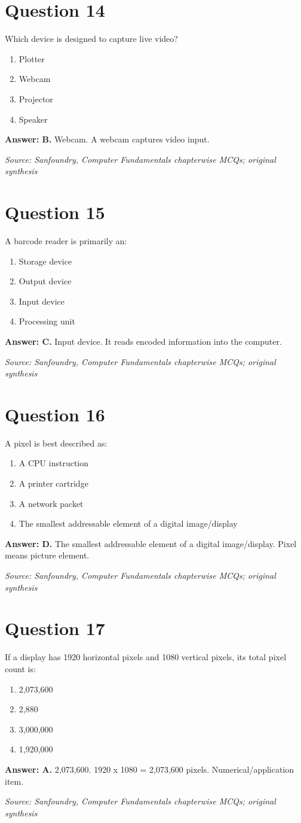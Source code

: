 \documentclass[11pt,a4paper]{book}
\newcommand{\source}[1]{\par\smallskip\textit{Source: #1}}
\newcommand{\answer}[2]{\par\textbf{Answer: #1.} #2}
\begin{document}
\section*{Question 14}
Which device is designed to capture live video?
\begin{enumerate}[label=\Alph*.]
\item Plotter
\item Webcam
\item Projector
\item Speaker
\end{enumerate}
\answer{B}{Webcam. A webcam captures video input.}
\source{Sanfoundry, Computer Fundamentals chapterwise MCQs; original synthesis}
\section*{Question 15}
A barcode reader is primarily an:
\begin{enumerate}[label=\Alph*.]
\item Storage device
\item Output device
\item Input device
\item Processing unit
\end{enumerate}
\answer{C}{Input device. It reads encoded information into the computer.}
\source{Sanfoundry, Computer Fundamentals chapterwise MCQs; original synthesis}
\section*{Question 16}
A pixel is best described as:
\begin{enumerate}[label=\Alph*.]
\item A CPU instruction
\item A printer cartridge
\item A network packet
\item The smallest addressable element of a digital image/display
\end{enumerate}
\answer{D}{The smallest addressable element of a digital image/display. Pixel means picture element.}
\source{Sanfoundry, Computer Fundamentals chapterwise MCQs; original synthesis}
\section*{Question 17}
If a display has 1920 horizontal pixels and 1080 vertical pixels, its total pixel count is:
\begin{enumerate}[label=\Alph*.]
\item 2,073,600
\item 2,880
\item 3,000,000
\item 1,920,000
\end{enumerate}
\answer{A}{2,073,600. 1920 x 1080 = 2,073,600 pixels. Numerical/application item.}
\source{Sanfoundry, Computer Fundamentals chapterwise MCQs; original synthesis}
\end{document}
